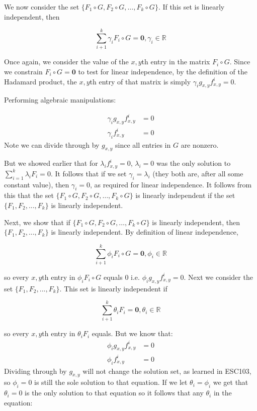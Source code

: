 \documentclass[10pt,addpoints]{exam} %
\newcommand{\R}{\mathbb{R}}
\begin{document}
\begin{questions}
\begin{parts}
{      We now consider the set $\{F_1 \circ G, F_2 \circ G, \dots, F_k \circ G\}$.  If this set is linearly independent, then 

      $$\sum_{i+1}^{k}\gamma_i F_i\circ G = \mathbf{0}, \gamma_i\in\R$$

      Once again, we consider the value of the $x,y$th entry in the matrix $F_i \circ G$. Since we constrain $F_i\circ G = \mathbf{0}$ to test for linear independence, by the definition of the Hadamard product, the $x,y$th entry of that matrix is simply $\gamma_i g_{x,y}f^i_{x,y}=0$.

      Performing algebraic manipulations:

      \begin{equation*}
        \begin{aligned}
        \gamma_i g_{x,y} f^i_{x,y} & = 0 \\
        \gamma_i f^i_{x,y} & = 0 
        \end{aligned}
      \end{equation*}
      Note we can divide through by $g_{x,y}$ since all entries in $G$ are nonzero.

      But we showed earlier that for $\lambda_i f^i_{x,y} = 0$, $\lambda_i = 0$ was the only solution to $\sum_{i=1}^{k} \lambda_i F_i = 0$. It follows that if we set $\gamma_i=\lambda_i$ (they both are, after all some constant value), then $\gamma_i=0$, as required for linear independence. It follows from this that the set $\{F_1 \circ G, F_2 \circ G, \dots, F_k \circ G\}$ is linearly independent if the set $\{F_1, F_2, ..., F_k\}$ is linearly independent. 

      Next, we show that if $\{F_1 \circ G, F_2 \circ G, \dots, F_k \circ G\}$ is linearly independent, then  $\{F_1, F_2, ..., F_k\}$ is linearly independent. By definition of linear independence, 

      $$\sum_{i+1}^{k}\phi_i F_i\circ G = \mathbf{0}, \phi_i\in\R$$
      
      so every $x,y$th entry in $\phi_i F_i\circ G$ equals 0 i.e. $\phi_i g_{x,y}f^i_{x,y}=0$. Next we consider the set $\{F_1, F_2, ..., F_k\}$. This set is linearly independent if 

      $$\sum_{i+1}^{k}\theta_i F_i = \mathbf{0}, \theta_i\in\R$$

      so every $x,y$th entry in $\theta_i F_i$ equals. But we know that:
      \begin{equation*}
        \begin{aligned}
        \phi_i g_{x,y} f^i_{x,y} & = 0 \\
        \phi_i f^i_{x,y} & = 0 
        \end{aligned}
      \end{equation*}
      Dividing through by $g_{x,y}$ will not change the solution set, as learned in ESC103, so $\phi_i=0$ is still the sole solution to that equation. If we let $\theta_i=\phi_i$ we get that $\theta_i=0$ is the only solution to that equation so it follows that any $\theta_i$ in the equation:

}
\end{parts}
\end{questions}
\end{document}
